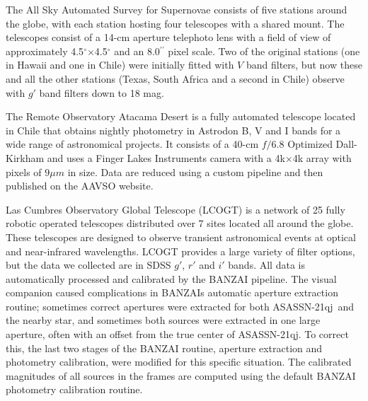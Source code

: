 \documentclass[sn-nature,oneside]{sn-jnl}%
\newcommand*\degr{\ensuremath{^\circ}}
\newcommand*\arcsec{\ensuremath{^{\prime\prime}}}   %
\newcommand{\asas}{ASASSN-21qj}
\begin{document}

The All Sky Automated Survey for Supernovae \cite[ASAS-SN; ][]{shappee_man_2014,kochanek_all-sky_2017} consists of five stations around the globe, with each station hosting four telescopes with a shared mount.
%
The telescopes consist of a 14-cm aperture telephoto lens with a field of view of approximately 4.5\degr{}$\times$4.5\degr{} and an 8.0\arcsec{} pixel scale.
% 
Two of the original stations (one in Hawaii and one in Chile) were initially fitted with $V$ band filters, but now these and all the other stations (Texas, South Africa and a second in Chile) observe with $g'$ band filters down to 18 mag.



The Remote Observatory Atacama Desert \cite[ROAD; ][]{Hambsch12} is a fully automated telescope located in Chile that obtains nightly photometry in Astrodon B, V and I bands for a wide range of astronomical projects.
%
It consists of a 40-cm $f/6.8$ Optimized Dall-Kirkham and uses a Finger Lakes Instruments camera with a 4k$\times$4k array with pixels of $9\mu m$ in size.
%
Data are reduced using a custom pipeline and then published on the AAVSO website.


Las Cumbres Observatory Global Telescope (LCOGT) is a network of 25 fully robotic operated telescopes distributed over 7 sites located all around the globe.
%
These telescopes are designed to observe transient astronomical events at optical and near-infrared wavelengths.
%
LCOGT provides a large variety of filter options, but the data we collected are in SDSS $g'$, $r'$ and $i'$ bands.
%
All data is automatically processed and calibrated by the BANZAI pipeline.
%
The visual companion caused complications in BANZAIs automatic aperture extraction routine; sometimes correct apertures were extracted for both \asas\ and the nearby star, and sometimes both sources were extracted in one large aperture, often with an offset from the true center of \asas.
%
To correct this, the last two stages of the BANZAI routine, aperture extraction and photometry calibration, were modified for this specific situation. 
%
The calibrated magnitudes of all sources in the frames are computed using the default BANZAI photometry calibration routine.
\end{document}
